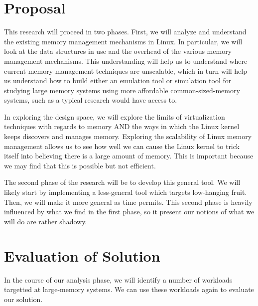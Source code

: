 \documentclass[twocolumn,11pt]{article}
\begin{document}
\section{Proposal}

This research will proceed in two phases. First, we will analyze and understand
the existing memory management mechanisms in Linux. In particular, we will look
at the data structures in use and the overhead of the various memory management
mechanisms. This understanding will help us to understand where current memory
management techniques are unscalable, which in turn will help us understand how
to build either an emulation tool or simulation tool for studying large memory
systems using more affordable common-sized-memory systems, such as a typical
research would have access to.

In exploring the design space, we will explore the limits of virtualization
techniques with regards to memory AND the ways in which the Linux kernel keeps
discovers and manages memory. Exploring the scalability of Linux memory
management allows us to see how well we can cause the Linux kernel to trick
itself into believing there is a large amount of memory. This is important
because we may find that this is possible but not efficient.

The second phase of the research will be to develop this general tool. We will
likely start by implementing a less-general tool which targets low-hanging
fruit. Then, we will make it more general as time permits. This second phase is
heavily influenced by what we find in the first phase, so it present our notions
of what we will do are rather shadowy.

\section{Evaluation of Solution}

In the course of our analysis phase, we will identify a number of workloads
targetted at large-memory systems. We can use these workloads again to evaluate
our solution.

{}

\end{document}
